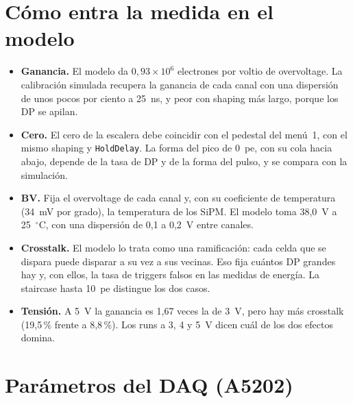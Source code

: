 \documentclass[11pt,a4paper]{article}
\begin{document}
\section{Cómo entra la medida en el modelo}
\label{sec:razon}

\begin{itemize}
\item {\bf Ganancia.} El modelo da $0{,}93\times10^6$ electrones por voltio
  de overvoltage. La calibración simulada recupera la ganancia de cada
  canal con una dispersión de unos pocos por ciento a 25~ns, y peor con
  shaping más largo, porque los DP se apilan.
\item {\bf Cero.} El cero de la escalera debe coincidir con el pedestal
  del menú~1, con el mismo shaping y \texttt{HoldDelay}. La forma del pico
  de 0~pe, con su cola hacia abajo, depende de la tasa de DP y de la forma
  del pulso, y se compara con la simulación.
\item {\bf BV.} Fija el overvoltage de cada canal y, con su coeficiente de
  temperatura (34~mV por grado), la temperatura de los SiPM. El modelo
  toma 38,0~V a 25~$^\circ$C, con una dispersión de 0,1 a 0,2~V entre
  canales.
\item {\bf Crosstalk.} El modelo lo trata como una ramificación: cada celda
  que se dispara puede disparar a su vez a sus vecinas. Eso fija cuántos DP
  grandes hay y, con ellos, la tasa de triggers falsos en las medidas de
  energía. La staircase hasta 10~pe distingue los dos casos.
\item {\bf Tensión.} A 5~V la ganancia es 1,67 veces la de 3~V, pero hay
  más crosstalk (19,5\,\% frente a 8,8\,\%). Los runs a 3, 4 y 5~V dicen
  cuál de los dos efectos domina.
\end{itemize}

\section{Parámetros del DAQ (A5202)}
\label{sec:janus}
\end{document}
